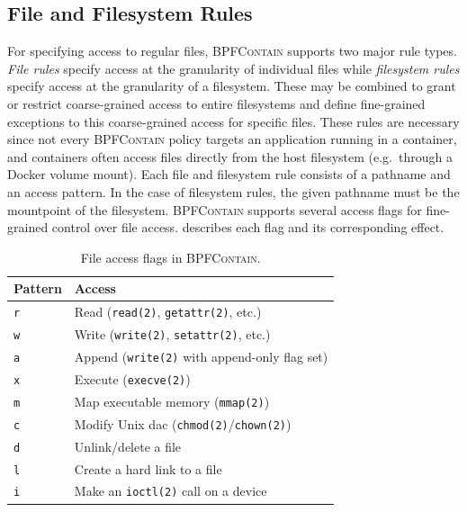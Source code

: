\documentclass[
  fontsize=12pt,
  titlepage=firstiscover,
  paper=letter,
oneside,
  cleardoublepage=plain,
  parskip=half-,
  DIV=10,
  parindent,
  appendixprefix,
  chapterprefix,
  listof=totoc,
]{scrbook}
\newcommand{\bpfcontain}{\textsc{BPFContain}}
\begin{document}
\subsection{File and Filesystem Rules}

For specifying access to regular files, \bpfcontain{} supports two major rule types.
\textit{File rules} specify access at the granularity of individual files while
\textit{filesystem rules} specify access at the granularity of a filesystem.  These may be
combined to grant or restrict coarse-grained access to entire filesystems and define
fine-grained exceptions to this coarse-grained access for specific files. These rules are
necessary since not every \bpfcontain{} policy targets an application running in
a container, and containers often access files directly from the host filesystem
(e.g.~through a Docker volume mount). Each file and filesystem rule consists of a pathname
and an access pattern. In the case of filesystem rules, the given pathname must be the
mountpoint of the filesystem. \bpfcontain{} supports several access flags for fine-grained
control over file access.  describes each flag and its
corresponding effect.

\begin{table}[htbp]
  \centering
  \caption[File access flags in \bpfcontain{}]{
    File access flags in \bpfcontain{}.
  }\label{tab:bpfcontain-file-access}
  \begin{tabular}{ll}
  \toprule
  Pattern & Access \\
  \midrule
  \texttt{r} & Read (\texttt{read(2)}, \texttt{getattr(2)}, etc.) \\
  \texttt{w} & Write (\texttt{write(2)}, \texttt{setattr(2)}, etc.)\\
  \texttt{a} & Append (\texttt{write(2)} with append-only flag set) \\
  \texttt{x} & Execute (\texttt{execve(2)})\\
  \texttt{m} & Map executable memory (\texttt{mmap(2)}) \\
  \texttt{c} & Modify Unix \gls{dac} (\texttt{chmod(2)}/\texttt{chown(2)}) \\
  \texttt{d} & Unlink/delete a file \\
  \texttt{l} & Create a hard link to a file \\
  \texttt{i} & Make an \texttt{ioctl(2)} call on a device \\
  \bottomrule
  \end{tabular}
\end{table}
\end{document}
